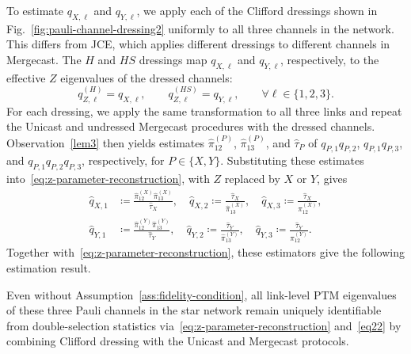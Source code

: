     To estimate $q_{X,\ell}$ and $q_{Y,\ell}$, we apply each of the
    Clifford dressings shown in Fig.~\ref{fig:pauli-channel-dressing2}
    uniformly to all three channels in the network.
    This differs from JCE, which applies different
    dressings to different channels in Mergecast.
    The $H$ and $HS$ dressings map $q_{X,\ell}$ and $q_{Y,\ell}$,
    respectively, to the effective $Z$ eigenvalues  of the dressed channels:
    \begin{equation}
        q_{Z,\ell}^{(H)}=q_{X,\ell},
        \qquad
        q_{Z,\ell}^{(HS)}=q_{Y,\ell},
        \qquad \forall \ell\in\{1,2,3\}.
    \end{equation}
For each dressing, we apply the same transformation to all
three links and repeat the Unicast{} and undressed Mergecast{}
procedures with the dressed channels.
Observation~\ref{lem3} then yields estimates
$\widehat{\pi}_{12}^{(P)}$, $\widehat{\pi}_{13}^{(P)}$, and
$\widehat{\tau}_P$ of $q_{P,1}q_{P,2}$, $q_{P,1}q_{P,3}$,
and $q_{P,1}q_{P,2}q_{P,3}$, respectively, for $P\in\{X,Y\}$.
Substituting these estimates into~\eqref{eq:z-parameter-reconstruction}, with $Z$ replaced
by $X$ or $Y$, gives
\begin{equation}
\begin{aligned}
    \widehat{q}_{X,1}
    &\coloneqq
    \frac{\widehat{\pi}_{12}^{(X)}
          \widehat{\pi}_{13}^{(X)}}{\widehat{\tau}_X},
    \quad
    \widehat{q}_{X,2}
    \coloneqq
    \frac{\widehat{\tau}_X}{\widehat{\pi}_{13}^{(X)}},
    \quad
    \widehat{q}_{X,3}
    \coloneqq
    \frac{\widehat{\tau}_X}{\widehat{\pi}_{12}^{(X)}},\\
    \widehat{q}_{Y,1}
    &\coloneqq
    \frac{\widehat{\pi}_{12}^{(Y)}
          \widehat{\pi}_{13}^{(Y)}}{\widehat{\tau}_Y},
    \quad
    \widehat{q}_{Y,2}
    \coloneqq
    \frac{\widehat{\tau}_Y}{\widehat{\pi}_{13}^{(Y)}},
    \quad
    \widehat{q}_{Y,3}
    \coloneqq
    \frac{\widehat{\tau}_Y}{\widehat{\pi}_{12}^{(Y)}}.
\end{aligned}
\label{eq22}
\end{equation}
Together with~\eqref{eq:z-parameter-reconstruction},
these estimators give the following estimation result.
\begin{theorem}
        \label{thm:reconstruction-without-fidelity}
        Even without Assumption~\ref{ass:fidelity-condition}, all link-level
        PTM eigenvalues of these three Pauli channels in the star network remain uniquely
        identifiable from double-selection statistics  via~\eqref{eq:z-parameter-reconstruction} and~\eqref{eq22} by combining
        Clifford dressing with the Unicast and Mergecast protocols.
    \end{theorem}
